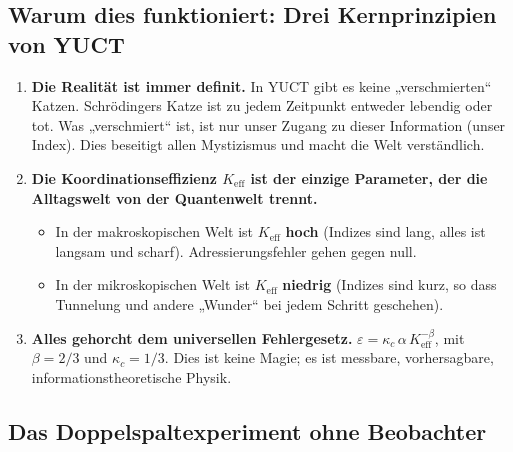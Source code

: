 \documentclass[12pt,a4paper]{article}
\theoremstyle{remark}
\begin{document}
	\subsection{Warum dies funktioniert: Drei Kernprinzipien von YUCT}
	
	\begin{enumerate}[leftmargin=*]
		\item \textbf{Die Realität ist immer definit.}
		In YUCT gibt es keine „verschmierten“ Katzen. Schrödingers Katze ist zu jedem Zeitpunkt entweder lebendig oder tot. Was „verschmiert“ ist, ist nur unser Zugang zu dieser Information (unser Index). Dies beseitigt allen Mystizismus und macht die Welt verständlich.
		
		\item \textbf{Die Koordinationseffizienz \(K_{\mathrm{eff}}\) ist der einzige Parameter, der die Alltagswelt von der Quantenwelt trennt.}
		\begin{itemize}
			\item In der makroskopischen Welt ist \(K_{\mathrm{eff}}\) \textbf{hoch} (Indizes sind lang, alles ist langsam und scharf). Adressierungsfehler gehen gegen null.
			\item In der mikroskopischen Welt ist \(K_{\mathrm{eff}}\) \textbf{niedrig} (Indizes sind kurz, so dass Tunnelung und andere „Wunder“ bei jedem Schritt geschehen).
		\end{itemize}
		
		\item \textbf{Alles gehorcht dem universellen Fehlergesetz.}
		\( \varepsilon = \kappa_c \, \alpha \, K_{\mathrm{eff}}^{-\beta} \), mit \( \beta = 2/3 \) und \( \kappa_c = 1/3 \). Dies ist keine Magie; es ist messbare, vorhersagbare, informationstheoretische Physik.
	\end{enumerate}
	
	\medskip
	
	\subsection{Das Doppelspaltexperiment ohne Beobachter}
	
\end{document}
